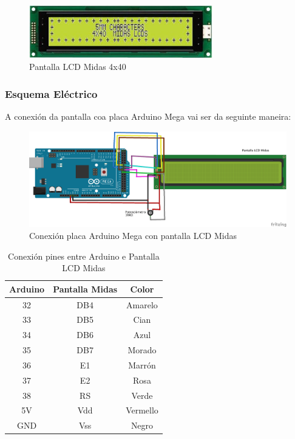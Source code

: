 \documentclass[11pt,twoside]{book}
\begin{document}
\begin{figure}[H]
	\begin{center}
		\includegraphics[width=8cm]{images/lcd.jpg}
	\end{center}
	\caption{Pantalla LCD Midas 4x40}
	\label{fig:PantallaLCD}
\end{figure}

\subsubsection{Esquema Eléctrico}

A conexión da pantalla coa placa Arduino Mega vai ser da seguinte maneira:

\begin{figure}[H]
	\begin{center}
		\includegraphics[width=15cm]{images/conexionArduinoLCD.png}
	\end{center}
	\caption{Conexión placa Arduino Mega con pantalla LCD Midas}
	\label{fig:ConexionESP8266}
\end{figure}

\begin{table}[h]
\begin{center}
\begin{tabular}{|c|c|c|}
\hline
Arduino & Pantalla Midas & Color \\
\hline
32 & DB4 & Amarelo \\
\hline
33 & DB5 & Cian\\
\hline
34 & DB6 & Azul \\
\hline
35 & DB7 & Morado \\
\hline
36 & E1 & Marrón \\
\hline
37 & E2 & Rosa \\
\hline
38 & RS & Verde \\
\hline
5V & Vdd & Vermello \\
\hline
GND & Vss & Negro \\
\hline
\end{tabular}
\caption{Conexión pines entre Arduino e Pantalla LCD Midas}
\label{TablaArduinoPantalla}
\end{center}
\end{table}
\end{document}
